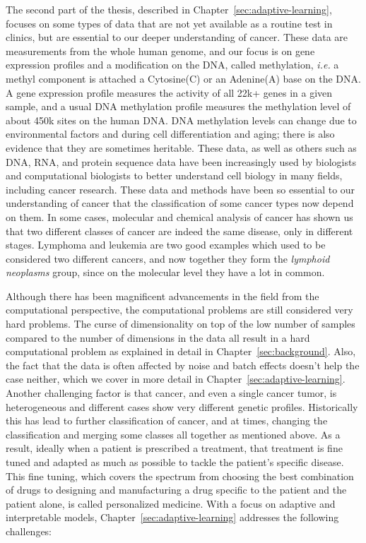The second part of the thesis, described in
Chapter~\ref{sec:adaptive-learning}, focuses on some types of data that are not
yet available as a routine test in clinics, but are essential to our deeper
understanding of cancer. These data are measurements from the whole human
genome, and our focus is on gene expression profiles and a modification on the
DNA, called methylation, \emph{i.e.} a methyl component is attached a
Cytosine(C) or an Adenine(A) base on the DNA. A gene expression profile
measures the activity of all 22k+ genes in a given sample, and a usual DNA
methylation profile measures the methylation level of about 450k sites on the
human DNA. DNA methylation levels can change due to environmental factors and
during cell differentiation and aging; there is also evidence that they are
sometimes heritable. These data, as well as others such as DNA, RNA, and
protein sequence data have been increasingly used by biologists and
computational biologists to better understand cell biology in many fields,
including cancer research. These data and methods have been so essential to our
understanding of cancer that the classification of some cancer types now depend
on them. In some cases, molecular and chemical analysis of cancer has shown us
that two different classes of cancer are indeed the same disease, only in
different stages. Lymphoma and leukemia are two good examples which used to be
considered two different cancers, and now together they form the \emph{lymphoid
  neoplasms} group, since on the molecular level they have a lot in common.

Although there has been magnificent advancements in the field from the
computational perspective, the computational problems are still considered very
hard problems. The curse of dimensionality on top of the low number of samples
compared to the number of dimensions in the data all result in a hard
computational problem as explained in detail in Chapter~\ref{sec:background}.
Also, the fact that the data is often affected by noise and batch effects
doesn't help the case neither, which we cover in more detail in
Chapter~\ref{sec:adaptive-learning}. Another challenging factor is that cancer,
and even a single cancer tumor, is heterogeneous and different cases show very
different genetic profiles. Historically this has lead to further
classification of cancer, and at times, changing the classification and merging
some classes all together as mentioned above. As a result, ideally when a
patient is prescribed a treatment, that treatment is fine tuned and adapted as
much as possible to tackle the patient's specific disease. This fine tuning,
which covers the spectrum from choosing the best combination of drugs to
designing and manufacturing a drug specific to the patient and the patient
alone, is called personalized medicine. With a focus on adaptive and
interpretable models, Chapter~\ref{sec:adaptive-learning} addresses the
following challenges:


